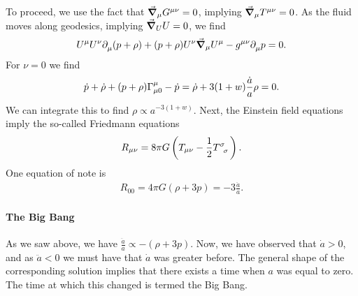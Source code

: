 To proceed, we use the fact that $\grad_{\mu}{G^{\mu\nu}} = 0$, implying $\grad_{\mu}{T^{\mu\nu}} = 0$. As the fluid moves along geodesics, implying $\grad_{U}{U} = 0$, we find
\begin{align*}
	U^{\mu}U^{\nu}\partial^{}_{\mu}(p + \rho) + (p + \rho)U^{\nu}\grad_{\mu}{U^{\mu}} - g^{\mu\nu}\partial^{}_{\mu}p = 0.
\end{align*}
For $\nu = 0$ we find
\begin{align*}
	\dot{p} + \dot{\rho} + (p + \rho)\chris{\mu}{\mu}{0} - \dot{p} = \dot{\rho} + 3(1 + w)\frac{\dot{a}}{a}\rho = 0.
\end{align*}
We can integrate this to find $\rho\propto a^{-3(1 + w)}$. Next, the Einstein field equations imply the so-called Friedmann equations
\begin{align*}
	R_{\mu\nu} = 8\pi G\left(T_{\mu\nu} - \frac{1}{2}\tensor{T}{^{\sigma}_{\sigma}}\right).
\end{align*}
One equation of note is
\begin{align*}
	R_{00} = 4\pi G(\rho + 3p) = -3\frac{\ddot{a}}{a}.
\end{align*}

\paragraph{The Big Bang}
As we saw above, we have $\frac{\ddot{a}}{a} \propto -(\rho + 3p)$. Now, we have observed that $\dot{a} > 0$, and as $\ddot{a} < 0$ we must have that $\dot{a}$ was greater before. The general shape of the corresponding solution implies that there exists a time when $a$ was equal to zero. The time at which this changed is termed the Big Bang.

